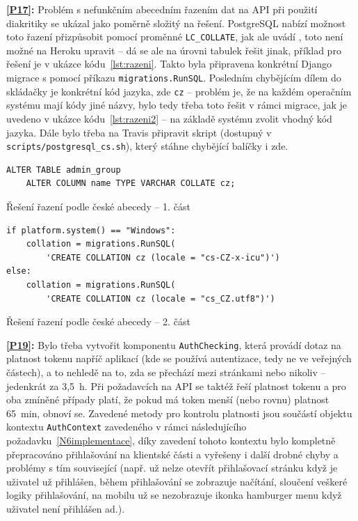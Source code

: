 \textbf{\ref{P17}:} Problém s nefunkčním abecedním řazením dat na API při použití diakritiky se ukázal jako poměrně složitý na řešení. PostgreSQL nabízí možnost toto řazení přizpůsobit pomocí proměnné \verb|LC_COLLATE|, jak ale uvádí \cite{heroku-razeni}, toto není možné na Heroku upravit -- dá se ale na úrovni tabulek řešit jinak, příklad pro řešení je v ukázce kódu~\ref{lst:razeni}. Takto byla připravena konkrétní Django migrace s pomocí příkazu \verb|migrations.RunSQL|. Posledním chybějícím dílem do skládačky je konkrétní kód jazyka, zde \verb|cz| -- problém je, že na každém operačním systému mají kódy jiné názvy, bylo tedy třeba toto řešit v rámci migrace, jak je uvedeno v ukázce kódu~\ref{lst:razeni2} -- na základě systému zvolit vhodný kód jazyka. Dále bylo třeba na Travis připravit skript (dostupný v \verb|scripts/postgresql_cs.sh|), který stáhne chybějící balíčky i zde.

\begin{listing}[ht]
	\begin{verbatim}
ALTER TABLE admin_group
    ALTER COLUMN name TYPE VARCHAR COLLATE cz;
	\end{verbatim}
	\caption{Řešení řazení podle české abecedy -- 1. část}\label{lst:razeni}
\end{listing}

\begin{listing}[ht]
	\begin{verbatim}
if platform.system() == "Windows":
    collation = migrations.RunSQL(
        'CREATE COLLATION cz (locale = "cs-CZ-x-icu")')
else:
    collation = migrations.RunSQL(
        'CREATE COLLATION cz (locale = "cs_CZ.utf8")')
	\end{verbatim}
	\caption{Řešení řazení podle české abecedy -- 2. část}\label{lst:razeni2}
\end{listing}

\textbf{\ref{P19}:} Bylo třeba vytvořit komponentu \verb|AuthChecking|, která provádí dotaz na platnost tokenu napříč aplikací (kde se používá autentizace, tedy ne ve veřejných částech), a to nehledě na to, zda se přechází mezi stránkami nebo nikoliv -- jedenkrát za 3,5~h. Při požadavcích na API se taktéž řeší platnost tokenu a pro oba zmíněné případy platí, že pokud má token menší (nebo rovnu) platnost 65~min, obnoví se. Zavedené metody pro kontrolu platnosti jsou součástí objektu kontextu \verb|AuthContext| zavedeného v rámci následujícího požadavku~\ref{N6implementace}, díky zavedení tohoto kontextu bylo kompletně přepracováno přihlašování na klientské části a vyřešeny i další drobné chyby a problémy s tím související (např. už nelze otevřít přihlašovací stránku když je uživatel už přihlášen, během přihlašování se zobrazuje načítání, sloučení veškeré logiky přihlašování, na mobilu už se nezobrazuje ikonka hamburger menu když uživatel není přihlášen ad.).

